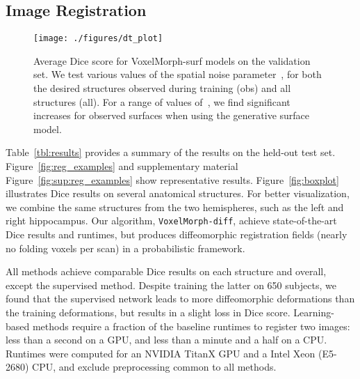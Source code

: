 \documentclass{article}
\begin{document}
\subsection{Image Registration} 



\begin{figure}[t!]
	\centering
	\texttt{[image: ./figures/dt\_plot]}
	\caption{Average Dice score for VoxelMorph-surf models on the validation set. We test various values of the spatial noise parameter~, for both the desired structures observed  during training (obs) and all structures (all). For a range of values of~, we find significant increases for observed surfaces when using the generative surface model. }
	\label{fig:surf-hyperparams}
\end{figure}




Table~\ref{tbl:results} provides a summary of the results on the held-out test set. Figure~\ref{fig:reg_examples} and supplementary material Figure~\ref{fig:sup:reg_examples} show representative results. Figure~\ref{fig:boxplot} illustrates Dice results on several anatomical structures. For better visualization, we combine the same structures from the two hemispheres, such as the left and right hippocampus. Our algorithm, \verb|VoxelMorph-diff|, achieve state-of-the-art Dice results and runtimes, but produces diffeomorphic registration fields (nearly no folding voxels per scan) in a probabilistic framework. 

{\color{blue}All methods achieve comparable Dice results on each structure and overall, except the supervised method. Despite training the latter on 650 subjects, we found that the supervised network leads to more diffeomorphic deformations than the training deformations, but results in a slight loss in Dice score.} Learning-based methods require a fraction of the baseline runtimes to register two images: less than a second on a GPU, and less than a minute and a half on a CPU. Runtimes were computed for an NVIDIA TitanX GPU and a Intel Xeon (E5-2680) CPU, and exclude preprocessing common to all methods. 
\end{document}
